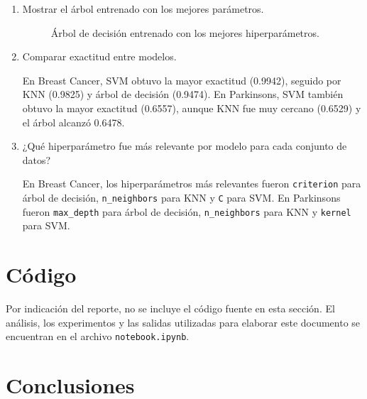 \documentclass{article}
\begin{document}
\begin{enumerate}
\begin{enumerate}
      \begin{figure}[h!]
      \centering
      \caption{Fronteras de decisión usando dos componentes principales.}
      \label{fig:decision-boundaries}
      \end{figure}

      \item Mostrar el árbol entrenado con los mejores parámetros.

      \begin{figure}[h!]
      \centering
      \caption{Árbol de decisión entrenado con los mejores hiperparámetros.}
      \label{fig:tree-placeholder}
      \end{figure}

      \item Comparar exactitud entre modelos.

      En Breast Cancer, SVM obtuvo la mayor exactitud (0.9942), seguido por KNN (0.9825) y árbol de decisión (0.9474). En Parkinsons, SVM también obtuvo la mayor exactitud (0.6557), aunque KNN fue muy cercano (0.6529) y el árbol alcanzó 0.6478.

      \item ¿Qué hiperparámetro fue más relevante por modelo para cada conjunto de datos?

      En Breast Cancer, los hiperparámetros más relevantes fueron \texttt{criterion} para árbol de decisión, \texttt{n\_neighbors} para KNN y \texttt{C} para SVM. En Parkinsons fueron \texttt{max\_depth} para árbol de decisión, \texttt{n\_neighbors} para KNN y \texttt{kernel} para SVM.
    \end{enumerate}
\end{enumerate}

\bigskip

\section{Código}
Por indicación del reporte, no se incluye el código fuente en esta sección. El análisis, los experimentos y las salidas utilizadas para elaborar este documento se encuentran en el archivo \texttt{notebook.ipynb}.

\section{Conclusiones}
\end{document}
